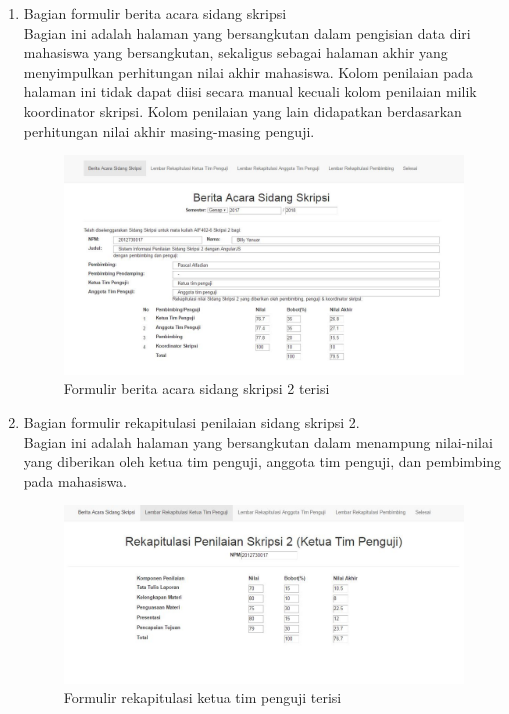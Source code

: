 	\begin{enumerate}
		\item Bagian formulir berita acara sidang skripsi\\
		Bagian ini adalah halaman yang bersangkutan dalam pengisian data diri mahasiswa yang bersangkutan, sekaligus sebagai halaman akhir yang menyimpulkan perhitungan nilai akhir mahasiswa. Kolom penilaian pada halaman ini tidak dapat diisi secara manual kecuali kolom penilaian milik koordinator skripsi. Kolom penilaian yang lain didapatkan berdasarkan perhitungan nilai akhir masing-masing penguji.
		\begin{figure}[H]
			\centering
			\includegraphics[scale=0.5]{Gambar/beritaacaraisi}
			\caption{Formulir berita acara sidang skripsi 2 terisi}
			\label{fig:beritaisi}
		\end{figure}
		\item Bagian formulir rekapitulasi penilaian sidang skripsi 2.\\
		Bagian ini adalah halaman yang bersangkutan dalam menampung nilai-nilai yang diberikan oleh ketua tim penguji, anggota tim penguji, dan pembimbing pada mahasiswa. 
		\begin{figure}[H]
			\centering
			\includegraphics[scale=0.5]{Gambar/ketuaisi}
			\caption{Formulir rekapitulasi ketua tim penguji terisi}

\end{figure}
\end{enumerate}
